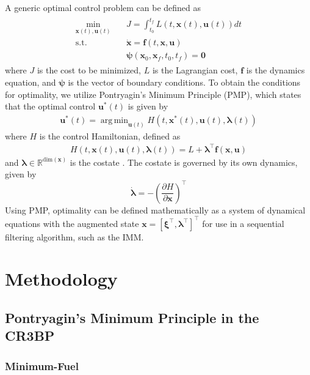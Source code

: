\documentclass[letterpaper, preprint, paper,11pt]{AAS}	%
\DeclareMathOperator*{\argmin}{arg\,min}
\newcommand{\R}{\mathbb{R}}
\begin{document}
A generic optimal control problem can be defined as
\begin{align}
\begin{split}
     \min_{\bm{x}(t), \bm{u}(t)} & \quad J = \int_{t_0}^{t_f} L(t, \bm{x}(t), \bm{u}(t)) dt \\
     \text{s.t.} & \quad  \dot{\bm{x}} = \bm{f}(t, \bm{x}, \bm{u}) \\
     & \quad \bm{\psi}(\bm{x}_0, \bm{x}_f, t_0, t_f) = \bm{0}
\end{split}
\end{align}
\noindent where $J$ is the cost to be minimized, $L$ is the Lagrangian cost, $\bm{f}$ is the dynamics equation, and $\bm{\psi}$ is the vector of boundary conditions. To obtain the conditions for optimality, we utilize Pontryagin's Minimum Principle (PMP), which states that the optimal control $\bm{u}^*(t)$ is given by
\begin{align}
    \bm{u}^*(t) = \argmin_{\bm{u}(t)} H(t, \bm{x}^*(t), \bm{u}(t), \bm{\lambda}(t)) \label{PMP optimal control}
\end{align}
\noindent where $H$ is the control Hamiltonian, defined as
\begin{align}
    H(t, \bm{x}(t), \bm{u}(t), \bm{\lambda}(t)) = L + \bm{\lambda}^\top \bm{f}(\bm{x}, \bm{u}) \label{PMP Hamiltonian}
\end{align}
\noindent and $\bm{\lambda} \in \R^{\text{dim}(\bm{x})}$ is the costate \cite{pontryagin1962}. The costate is governed by its own dynamics, given by
\begin{equation}
    \dot{\bm{\lambda}} = -\left(\frac{\partial H}{\partial\bm{x}} \right)^\top \label{PMP costate dynamics}
\end{equation}
Using PMP, optimality can be defined mathematically as a system of dynamical equations with the augmented state $\bm{x} = [\bm{\xi}^\top, \bm{\lambda}^\top]^\top$ for use in a sequential filtering algorithm, such as the IMM.

\section{Methodology}

\subsection{Pontryagin's Minimum Principle in the CR3BP}

\subsubsection{Minimum-Fuel}
\end{document}
